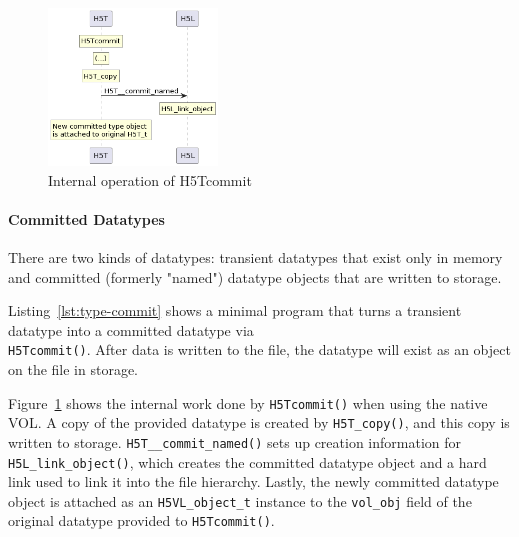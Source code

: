\begin{figure}
\centering
\includegraphics[width=0.4\textwidth]{images/tour_5_uml_datatype_commit.png}
\caption{Internal operation of H5Tcommit}
\label{fig:tour-5-uml-datatype-commit}
\end{figure}

\paragraph{Committed Datatypes} There are two kinds of datatypes: transient datatypes that exist only in memory and committed (formerly "named") datatype objects that are written to storage.

Listing~\ref{lst:type-commit} shows a minimal program that turns a transient datatype into a committed datatype via \\ \texttt{H5Tcommit()}. After data is written to the file, the datatype will exist as an object on the file in storage.

Figure~\ref{fig:tour-5-uml-datatype-commit} shows the internal work done by \texttt{H5Tcommit()} when using the native VOL. A copy of the provided datatype is created by \texttt{H5T\_copy()}, and this copy is written to storage. \texttt{H5T\_\_commit\_named()} sets up creation information for \texttt{H5L\_link\_object()}, which creates the committed datatype object and a hard link used to link it into the file hierarchy. Lastly, the newly committed datatype object is attached as an \texttt{H5VL\_object\_t} instance to the \texttt{vol\_obj} field of the original datatype provided to \texttt{H5Tcommit()}.

